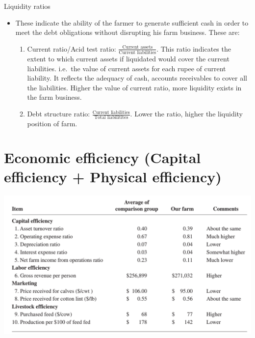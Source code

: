 \documentclass[12pt,ignorenonframetext,aspectratio=169]{beamer}
\providecommand{\tightlist}{%
  \setlength{\itemsep}{0pt}\setlength{\parskip}{0pt}}
\begin{document}
\begin{frame}{Liquidity ratios}
\protect\hypertarget{liquidity-ratios}{}
\begin{itemize}
\tightlist
\item
  These indicate the ability of the farmer to generate sufficient cash
  in order to meet the debt obligations without disrupting his farm
  business. These are:

  \begin{enumerate}
  \tightlist
  \item
    Current ratio/Acid test ratio:
    \(\frac{\textrm{Current assets}}{\textrm{Current liabilities}}\).
    This ratio indicates the extent to which current assets if
    liquidated would cover the current liabilities. i.e.~the value of
    current assets for each rupee of current liability. It reflects the
    adequacy of cash, accounts receivables to cover all the liabilities.
    Higher the value of current ratio, more liquidity exists in the farm
    business.
  \item
    Debt structure ratio:
    \(\frac{\textrm{Current liabilities}}{\textrm{Total liabilitites}}\).
    Lower the ratio, higher the liquidity position of farm.
  \end{enumerate}
\end{itemize}
\end{frame}

\hypertarget{economic-efficiency-capital-efficiency-physical-efficiency}{%
\section{Economic efficiency (Capital efficiency + Physical
efficiency)}\label{economic-efficiency-capital-efficiency-physical-efficiency}}

\begin{frame}{}
\protect\hypertarget{section-7}{}
\begin{center}\includegraphics[width=0.8\linewidth]{./figs/farm_economic_efficiency_ratios} \end{center}
\end{frame}
\end{document}
